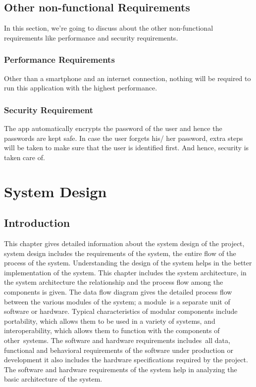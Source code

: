 \documentclass[BTech]{srmuthesis}
\begin{document}
\section{Other non-functional Requirements}
In this section, we're going to discuss about the other non-functional requirements like performance and security requirements. 
\subsection{Performance Requirements}
Other than a smartphone and an internet connection, nothing will be required to run this application with the highest performance.
\subsection{Security Requirement}
The app automatically encrypts the password of the user and hence the passwords are kept safe. In case the user forgets his/ her password, extra steps will be taken to make sure that the user is identified first. And hence, security is taken care of.
\chapter{System Design}
\section{Introduction}
This chapter gives detailed information about the system design of the project, system design includes the requirements of the system, the entire flow of the process of the system. Understanding the design of the system helps in the better implementation of the system. This chapter includes the system architecture, in the system architecture the relationship and the process flow among the components is given. The data flow diagram gives the detailed process flow between the various modules of the system; a module is a separate unit of software or hardware. Typical characteristics of modular components include portability, which allows them to be used in a variety of systems, and interoperability, which allows them to function with the components of other systems. The  software and hardware requirements includes all data, functional and behavioral requirements of the software under production or development it also includes the hardware specifications required by the project. The software and hardware requirements of the system help in analyzing the basic architecture of the system. 
\end{document}
